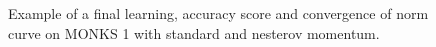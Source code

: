 \begin{appendices}
\begin{figure}[H]
\begin{subfigure}{0.40\textwidth}
                    \label{fig:monks_1_ACC_SGD}
                \end{subfigure}
                \begin{subfigure}{0.40\textwidth}
                    \caption{}
                    \label{fig:monks_1_NORM_SGD}
                \end{subfigure}
                \caption{Example of a final learning, accuracy score and convergence of norm curve on MONKS 1 with standard and nesterov momentum.}
                \label{fig:monks_1_SGD}
            \end{figure}


\end{appendices}
